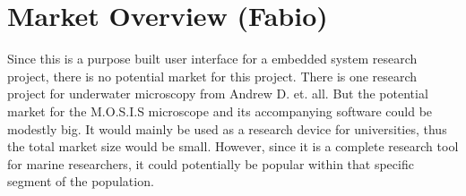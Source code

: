 \section{Market Overview (Fabio)}
Since this is a purpose built user interface for a embedded system research project, there is no potential market for this project. There is one research project for underwater microscopy from Andrew D. et. all.\cite{mullenUnderwaterMicroscopySitu2016} But the potential market for the M.O.S.I.S microscope and its accompanying software could be modestly big. It would mainly be used as a research device for universities, thus the total market size would be small. However, since it is a complete research tool for marine researchers, it could potentially be popular within that specific segment of the population.